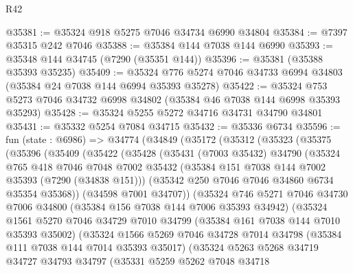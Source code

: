 \begin{lexlean}{R42}
\begin{coremodule}
{@35381 := @35324 @918 @5275 @7046 @34734 @6990 @34804
@35384 := @7397 @35315 @242 @7046
@35388 := @35384 @144 @7038 @144 @6990
@35393 := @35348 @144 @34745 (@7290 (@35351 @144))
@35396 := @35381 (@35388 @35393 @35235)
@35409 := @35324 @776 @5274 @7046 @34733 @6994 @34803 (@35384 @24 @7038 @144 @6994 @35393 @35278)
@35422 := @35324 @753 @5273 @7046 @34732 @6998 @34802 (@35384 @46 @7038 @144 @6998 @35393 @35293)
@35428 := @35324 @5255 @5272 @34716 @34731 @34790 @34801
@35431 := @35332 @5254 @7084 @34715
@35432 := @35336 @6734
@35596 := fun (state : @6986) =>
  @34774
    (@34849
      (@35172
        (@35312
          (@35323
            (@35375
              (@35396
                (@35409
                  (@35422
                    (@35428
                      (@35431
                        (@7003 @35432)
                        @34790
                        (@35324
                          @765
                          @418
                          @7046
                          @7048
                          @7002
                          @35432
                          (@35384 @151 @7038 @144 @7002 @35393 (@7290 (@34838 @151)))
                          (@35342 @250 @7046 @7046 @34860 @6734 @35354 @35368))
                        (@34598 @7001 @34707))
                      (@35324
                        @746
                        @5271
                        @7046
                        @34730
                        @7006
                        @34800
                        (@35384 @156 @7038 @144 @7006 @35393 @34942)
                        (@35324
                          @1561
                          @5270
                          @7046
                          @34729
                          @7010
                          @34799
                          (@35384 @161 @7038 @144 @7010 @35393 @35002)
                          (@35324
                            @1566
                            @5269
                            @7046
                            @34728
                            @7014
                            @34798
                            (@35384 @111 @7038 @144 @7014 @35393 @35017)
                            (@35324
                              @5263
                              @5268
                              @34719
                              @34727
                              @34793
                              @34797
                              (@35331
                                @5259
                                @5262
                                @7048
                                @34718
}
\end{coremodule}
\end{lexlean}
